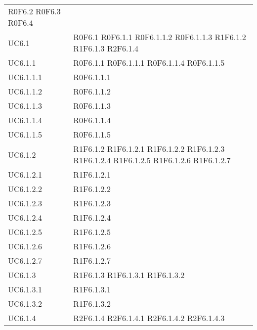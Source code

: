 \begin{longtable}{p{2.5cm}!{\VRule[1pt]}p{5.5cm}}
	\newline R0F6.2
	\newline R0F6.3
	\newline R0F6.4\\
UC6.1 & R0F6.1
	\newline R0F6.1.1
	\newline R0F6.1.1.2
	\newline R0F6.1.1.3
	\newline R1F6.1.2
	\newline R1F6.1.3
	\newline R2F6.1.4\\
UC6.1.1 & R0F6.1.1
	\newline R0F6.1.1.1
	\newline R0F6.1.1.4
	\newline R0F6.1.1.5\\
UC6.1.1.1 & R0F6.1.1.1\\
UC6.1.1.2 & R0F6.1.1.2\\
UC6.1.1.3 & R0F6.1.1.3\\
UC6.1.1.4 & R0F6.1.1.4\\
UC6.1.1.5 & R0F6.1.1.5\\
UC6.1.2 & R1F6.1.2
	\newline R1F6.1.2.1
	\newline R1F6.1.2.2
	\newline R1F6.1.2.3
	\newline R1F6.1.2.4
	\newline R1F6.1.2.5
	\newline R1F6.1.2.6
	\newline R1F6.1.2.7\\
UC6.1.2.1 & R1F6.1.2.1\\
UC6.1.2.2 & R1F6.1.2.2\\
UC6.1.2.3 & R1F6.1.2.3\\
UC6.1.2.4 & R1F6.1.2.4\\
UC6.1.2.5 & R1F6.1.2.5\\
UC6.1.2.6 & R1F6.1.2.6\\
UC6.1.2.7 & R1F6.1.2.7\\
UC6.1.3 & R1F6.1.3
	\newline R1F6.1.3.1
	\newline R1F6.1.3.2\\
UC6.1.3.1 & R1F6.1.3.1\\
UC6.1.3.2 & R1F6.1.3.2\\
UC6.1.4 & R2F6.1.4
	\newline R2F6.1.4.1
	\newline R2F6.1.4.2
	\newline R2F6.1.4.3\\

\end{longtable}
